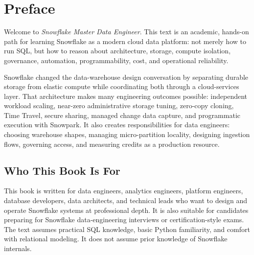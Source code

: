 \chapter*{Preface}
Welcome to \textit{Snowflake Master Data Engineer}. This text is an academic, hands-on path for learning Snowflake as a modern cloud data platform: not merely how to run SQL, but how to reason about architecture, storage, compute isolation, governance, automation, programmability, cost, and operational reliability.

Snowflake changed the data-warehouse design conversation by separating durable storage from elastic compute while coordinating both through a cloud-services layer. That architecture makes many engineering outcomes possible: independent workload scaling, near-zero administrative storage tuning, zero-copy cloning, Time Travel, secure sharing, managed change data capture, and programmatic execution with Snowpark. It also creates responsibilities for data engineers: choosing warehouse shapes, managing micro-partition locality, designing ingestion flows, governing access, and measuring credits as a production resource.

\section*{Who This Book Is For}
This book is written for data engineers, analytics engineers, platform engineers, database developers, data architects, and technical leads who want to design and operate Snowflake systems at professional depth. It is also suitable for candidates preparing for Snowflake data-engineering interviews or certification-style exams. The text assumes practical SQL knowledge, basic Python familiarity, and comfort with relational modeling. It does not assume prior knowledge of Snowflake internals.

